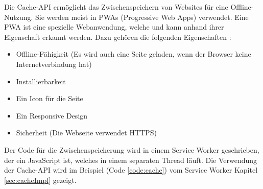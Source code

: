 
Die Cache-API ermöglicht das Zwischenspeichern von Websites für eine Offline-Nutzung.
Sie werden meist in PWAs (Progressive Web Apps) verwendet. Eine PWA ist eine spezielle Webanwendung, welche und kann anhand ihrer Eigenschaft erkannt werden. Dazu gehören die folgenden Eigenschaften \cite{datacodedesignPWA}:
\begin{itemize}
    \item Offline-Fähigkeit (Es wird auch eine Seite geladen, wenn der Browser keine Internetverbindung hat)
    \item Installierbarkeit 
    \item Ein Icon für die Seite
    \item Ein Responsive Design
    \item Sicherheit (Die Webseite verwendet HTTPS)
\end{itemize}

Der Code für die Zwischenspeicherung wird in einem Service Worker geschrieben, der ein JavaScript ist, welches in einem separaten Thread läuft. Die Verwendung der Cache-API wird im Beispiel (Code \ref{code:cache}) vom Service Worker Kapitel \ref{sec:cacheImpl} gezeigt.